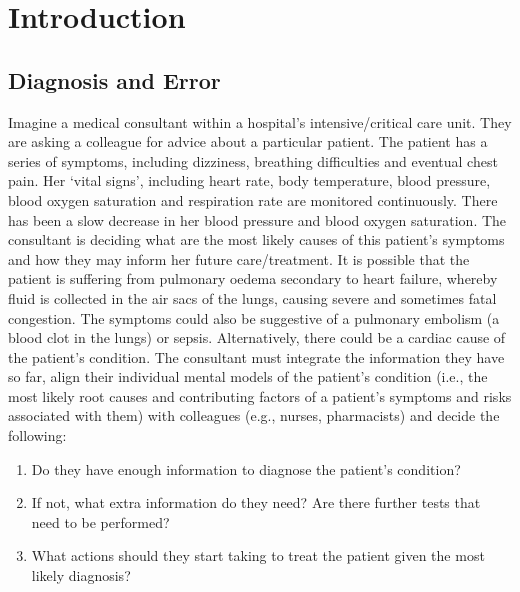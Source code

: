 \documentclass[a4paper, nobind]{templates/ociamthesis}
\providecommand{\tightlist}{%
  \setlength{\itemsep}{0pt}\setlength{\parskip}{0pt}}
\begin{document}
\flushbottom

\chapter{Introduction}\label{chapter-1}

\adjustmtc
{}

\section{Diagnosis and Error}\label{diagnosis-and-error}

Imagine a medical consultant within a hospital's intensive/critical care unit. They are asking a colleague for advice about a particular patient. The patient has a series of symptoms, including dizziness, breathing difficulties and eventual chest pain. Her `vital signs', including heart rate, body temperature, blood pressure, blood oxygen saturation and respiration rate are monitored continuously. There has been a slow decrease in her blood pressure and blood oxygen saturation. The consultant is deciding what are the most likely causes of this patient's symptoms and how they may inform her future care/treatment. It is possible that the patient is suffering from pulmonary oedema secondary to heart failure, whereby fluid is collected in the air sacs of the lungs, causing severe and sometimes fatal congestion. The symptoms could also be suggestive of a pulmonary embolism (a blood clot in the lungs) or sepsis. Alternatively, there could be a cardiac cause of the patient's condition. The consultant must integrate the information they have so far, align their individual mental models of the patient's condition (i.e., the most likely root causes and contributing factors of a patient's symptoms and risks associated with them) with colleagues (e.g., nurses, pharmacists) and decide the following:

\begin{enumerate}
\def\labelenumi{\arabic{enumi}.}
\tightlist
\item
  Do they have enough information to diagnose the patient's condition?
\item
  If not, what extra information do they need? Are there further tests that need to be performed?
\item
  What actions should they start taking to treat the patient given the most likely diagnosis?
\end{enumerate}
\end{document}
